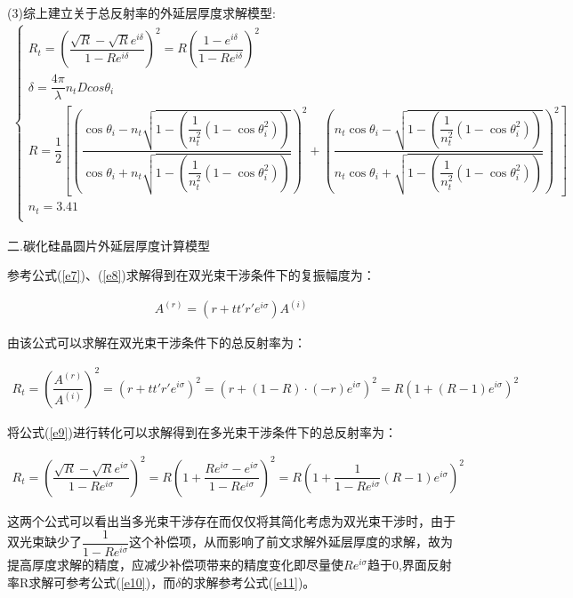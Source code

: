 \documentclass[UTF8]{ctexart}
\begin{document}
(3)综上建立关于总反射率的外延层厚度求解模型:
\begin{align}
	\begin{cases}
		R_t=(\dfrac{\sqrt{R}-\sqrt{R}e^{i\delta}}{1-Re^{i\delta}})^2=R(\dfrac{1-e^{i\delta}}{1-Re^{i\delta}})^2 \\
		\delta=\dfrac{4\pi}{\lambda}n_tDcos\theta_i\\
		R=\dfrac{1}{2}[(\dfrac{\cos\theta_i-n_t\sqrt{1-(\dfrac{1}{n_t^2}(1-\cos\theta_i^2))}}{\cos\theta_i+n_t\sqrt{1-(\dfrac{1}{n_t^2}(1-\cos\theta_i^2))}})^2+(\dfrac{n_t\cos\theta_i-\sqrt{1-(\dfrac{1}{n_t^2}(1-\cos\theta_i^2))}}{n_t\cos\theta_i+\sqrt{1-(\dfrac{1}{n_t^2}(1-\cos\theta_i^2))}})^2]\\
		n_t=3.41\\
\end{cases}
\end{align}\par
二.碳化硅晶圆片外延层厚度计算模型\par 
参考公式(\ref{e7})、(\ref{e8})求解得到在双光束干涉条件下的复振幅度为：\par 
\begin{align}
	A^ {(r)}=(r+tt'r'e^{i\sigma})A^{(i)}
\end{align}\par 
由该公式可以求解在双光束干涉条件下的总反射率为：\par 
\begin{align}
	R_t=(\dfrac{A^{(r)}}{A^{(i)} }  )^2=(r+tt'r'e^{i\sigma})^2=(r+(1-R)\cdot(-r) e^{i\sigma}  )^2=R(1+(R-1)e^{i\sigma} )^2
\end{align}\par 
将公式(\ref{e9})进行转化可以求解得到在多光束干涉条件下的总反射率为：\par 
\begin{align}
	R_t=(\dfrac{\sqrt{R}-\sqrt{R} e^{i\sigma}}{1-Re^{i\sigma}})^2=R(1+\dfrac{Re^{i\sigma} -e^{i\sigma}  }{1-Re^{i\sigma}  })^2=R(1+\dfrac{1}{1-Re^{i\sigma} }(R-1)e^{i\sigma} )^2
\end{align}\par 
这两个公式可以看出当多光束干涉存在而仅仅将其简化考虑为双光束干涉时，由于双光束缺少了$\dfrac{1}{1-Re^{i\sigma}}$这个补偿项，从而影响了前文求解外延层厚度的求解，故为提高厚度求解的精度，应减少补偿项带来的精度变化即尽量使$Re^{i\sigma}$趋于0,界面反射率R求解可参考公式(\ref{e10})，而$\delta$的求解参考公式(\ref{e11})。\par 
\end{document}
